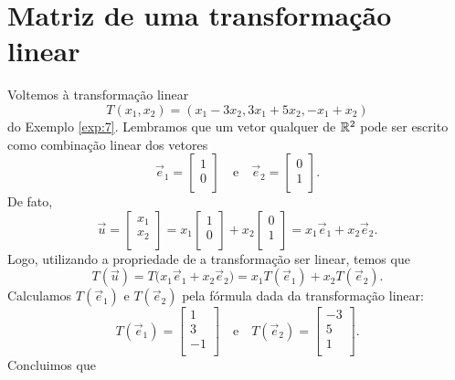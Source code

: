 \documentclass[../livro.tex]{subfiles}
\begin{document}
\section{Matriz de uma transformação linear}


Voltemos à transformação linear
\begin{equation}
T(x_1, x_2) = (x_1 - 3 x_2, 3x_1 + 5x_2, -x_1 + x_2)
\end{equation} do Exemplo \ref{exp:7}. Lembramos que um vetor qualquer de $\mathbb{R}^2$ pode ser escrito como combinação linear dos vetores
\begin{equation}
\vec{e}_1 =
\left[
  \begin{array}{r}
    1 \\
    0 \\
  \end{array}
\right]\quad \text{e}\quad
\vec{e}_2 =
\left[
  \begin{array}{c}
    0\\
    1\\
  \end{array}
\right].
\end{equation} De fato,
\begin{equation}
\vec{u} =
\left[
  \begin{array}{r}
    x_1 \\
    x_2 \\
  \end{array}
\right] =
x_1 \left[
  \begin{array}{r}
    1 \\
    0 \\
  \end{array}
\right] +
x_2 \left[
  \begin{array}{c}
    0\\
    1\\
  \end{array}
\right] = x_1 \vec{e}_1 + x_2 \vec{e}_2.
\end{equation} Logo, utilizando a propriedade de a transformação ser linear, temos que
\begin{equation}
T( \vec{u} ) = T\big( x_1 \vec{e}_1 + x_2 \vec{e}_2 \big) = x_1 T(\vec{e}_1) + x_2 T(\vec{e}_2).
\end{equation} Calculamos $T(\vec{e}_1)$ e $T(\vec{e}_2)$ pela fórmula dada da transformação linear:
\begin{equation}
T(\vec{e}_1) =
\left[
  \begin{array}{r}
    1 \\
    3 \\
    -1 \\
  \end{array}
\right] \quad \text{e}\quad
T(\vec{e}_2) =
\left[
  \begin{array}{r}
    -3 \\
     5 \\
     1 \\
  \end{array}
\right].
\end{equation} Concluimos que
\end{document}
